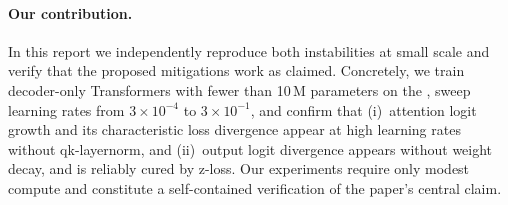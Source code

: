 \paragraph{Our contribution.}
In this report we independently reproduce both instabilities at small scale
and verify that the proposed mitigations work as claimed.
Concretely, we train decoder-only Transformers with fewer than 10\,M
parameters on the , sweep learning rates from $3\times10^{-4}$ to
$3\times10^{-1}$, and confirm that (i)~attention logit growth and its
characteristic loss divergence appear at high learning rates without
qk-layernorm, and (ii)~output logit divergence appears without weight decay,
and is reliably cured by z-loss.
Our experiments require only modest compute and constitute a self-contained
verification of the paper's central claim.